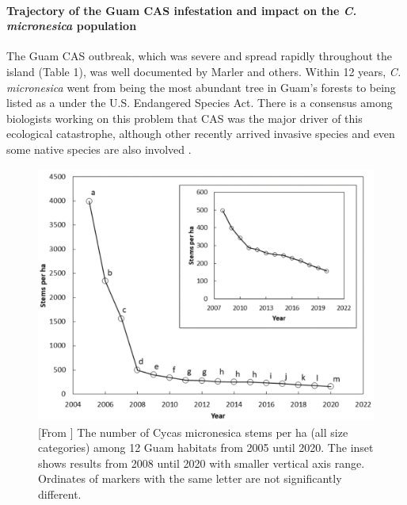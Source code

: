\documentclass[12pt,letterpaper,english,bibliography=totocnumbered, abstract=on]{scrartcl}
\begin{document}

\paragraph{Trajectory of the Guam CAS infestation and impact on the \textit{C. micronesica} population}

The Guam CAS outbreak, which was severe and spread rapidly throughout the island (Table 1), was well documented by Marler and others. Within 12 years, \textit{C. micronesica} went from being the most abundant tree in Guam's forests to being listed as a under the U.S. Endangered Species Act. There is a consensus among biologists working on this problem that CAS was the major driver of this ecological catastrophe, although other recently arrived invasive species and even some native species are also involved \parencite{mooreCoalitionInvasiveSpecies2013}.


\begin{figure}[H]
	\centering
	\includegraphics[width=\linewidth]{marler-stem-count}
	
	\caption{[From \cite{marlerLongitudeForestFragmentation2020}] The number
		of Cycas micronesica stems per ha (all size categories) among 12 Guam habitats
		from 2005 until 2020. The inset shows results from 2008 until 2020 with smaller vertical axis range. Ordinates of markers with the same letter are not significantly different.}
	
	\label{fig:marler-stem-count}
\end{figure}
\end{document}
